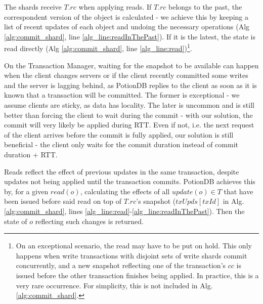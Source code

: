 \documentclass[sigconf, nonacm]{acmart}
\begin{document}
The shards receive $T.rc$ when applying reads.
If $T.rc$ belongs to the past, the correspondent version of the object is calculated - we achieve this by keeping a list of recent updates of each object and undoing the necessary operations (Alg \ref{alg:commit_shard}, line \ref{alg_line:readInThePast}). %
If it is the latest, the state is read directly (Alg \ref{alg:commit_shard}, line \ref{alg_line:read})\footnote{On an exceptional scenario, the read may have to be put on hold. This only happens when write transactions with disjoint sets of write shards commit concurrently, and a new snapshot reflecting one of the transaction's $cc$ is issued before the other transaction finishes being applied. In practice, this is a very rare occurrence. For simplicity, this is not included in Alg. \ref{alg:commit_shard}.}.

On the Transaction Manager, waiting for the snapshot to be available can happen when the client changes servers or if the client recently committed some writes and the server is lagging behind, as PotionDB replies to the client as soon as it is known that a transaction will be committed.
The former is exceptional - we assume clients are sticky, as data has locality.
The later is uncommon and is still better than forcing the client to wait during the commit - with our solution, the commit will very likely be applied during RTT.
Even if not, i.e. the next request of the client arrives before the commit is fully applied, our solution is still beneficial -  the client only waits for the commit duration instead of commit duration + RTT.

Reads reflect the effect of previous updates in the same transaction, despite updates not being applied until the transaction commits.
PotionDB achieves this by, for a given $\mathit{read(o)}$, calculating the effects of all $\mathit{update(o)} \in T$ that have been issued before said read on top of $T.rc$'s snapshot ($\mathit{txUpds[txId]}$ in Alg. \ref{alg:commit_shard}, lines \ref{alg_line:read}-\ref{alg_line:readInThePast}).
Then the state of $o$ reflecting such changes is returned.
\end{document}
